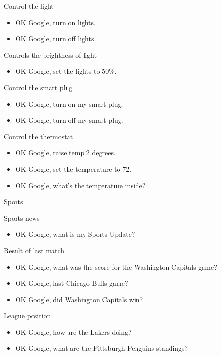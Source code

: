 \documentclass[
  letterpaper,
  DIV=11,
  numbers=noendperiod]{scrartcl}
\providecommand{\tightlist}{%
  \setlength{\itemsep}{0pt}\setlength{\parskip}{0pt}}\usepackage{longtable,booktabs,array}
\begin{document}
Control the light

\begin{itemize}
\item
  OK Google, turn on lights.
\item
  OK Google, turn off lights.
\end{itemize}

Controls the brightness of light

\begin{itemize}
\tightlist
\item
  OK Google, set the lights to 50\%.
\end{itemize}

Control the smart plug

\begin{itemize}
\item
  OK Google, turn on my smart plug.
\item
  OK Google, turn off my smart plug.
\end{itemize}

Control the thermostat

\begin{itemize}
\item
  OK Google, raise temp 2 degrees.
\item
  OK Google, set the temperature to 72.
\item
  OK Google, what's the temperature inside?
\end{itemize}

Sports

Sports news

\begin{itemize}
\tightlist
\item
  OK Google, what is my Sports Update?
\end{itemize}

Result of last match

\begin{itemize}
\item
  OK Google, what was the score for the Washington Capitals game?
\item
  OK Google, last Chicago Bulls game?
\item
  OK Google, did Washington Capitals win?
\end{itemize}

League position

\begin{itemize}
\item
  OK Google, how are the Lakers doing?
\item
  OK Google, what are the Pittsburgh Penguins standings?
\end{itemize}
\end{document}
